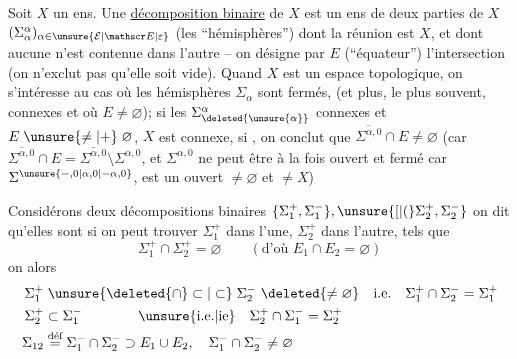 Soit $X$ un ens. Une \uline{décomposition binaire} de $X$ est un ens de deux parties de $X$ $(\Sigma_{\alpha}^{\alpha})_{\alpha\in\unsure{\mathcal E|\mathscr E|\varepsilon}}$ (les ``hémisphères'') dont la réunion est $X$, et dont  aucune n'est contenue dans l'autre -- on désigne par $E$ (``équateur'') l'intersection (on n'exclut pas qu'elle soit vide). Quand $X$ est un espace topologique, on s'intéresse au cas où les hémisphères $\Sigma_{\alpha}$ sont fermés, (et  plus, le plus souvent,  connexes  et où $E\ne\varnothing$); si les $\Sigma_{\deleted{\unsure{\alpha}}}^{\alpha}$ connexes et $E\mathrel{\unsure{\ne|+}}\varnothing$, $X$ est connexe, si ,  on conclut  que $\overline{\Sigma^{\alpha,0}}\cap E\ne\varnothing$
\reversemarginpar{}\normalmarginpar
(car $\overline{\Sigma^{\alpha,0}}\cap E=\overline{\Sigma^{\alpha,0}}\setminus\Sigma^{\alpha,0}$, et $\Sigma^{\alpha,0}$ ne peut être à la fois ouvert et fermé car $\Sigma^{\unsure{-,0|\alpha,0|-\alpha,0}}$, est un ouvert $\ne\varnothing$ et $\ne X$)

Considérons deux décompositions binaires $\{\Sigma_1^{+},\Sigma_1^{-}\},\unsure{[|(}\Sigma_2^{+},\Sigma_2^{-}\}$   on dit qu'elles sont \uline{} si  on peut trouver $\Sigma_1^{+}$ dans l'une, $\Sigma_2^{+}$ dans l'autre, tels que
\[
\Sigma_1^{+}\cap\Sigma_2^{+}=\varnothing\qquad(\text{d'où }E_1\cap E_2=\varnothing)
\]
on  alors
\[
\begin{aligned}
\Sigma_1^{+}&\mathrel{\unsure{\deleted{\cap}\subset|\subset}}\Sigma_2^{-}\ \deleted{\ne\varnothing}\quad\text{i.e.}\quad\Sigma_1^{+}\cap\Sigma_2^{-}=\Sigma_1^{+}\\
\Sigma_2^{+}&\subset\Sigma_1^{-}\qquad\qquad\text{\unsure{i.e.|ie}}\quad\Sigma_2^{+}\cap\Sigma_1^{-}=\Sigma_2^{+}\\
\Sigma_{12}&\overset{\text{déf}}{=}\Sigma_1^{-}\cap\Sigma_2^{-}\supset E_1\cup E_2,\quad\Sigma_1^{-}\cap\Sigma_2^{-}\ne\varnothing
\end{aligned}
\]
